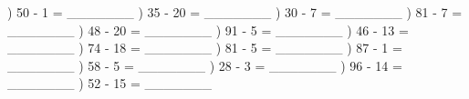 \documentclass{article}%
\begin{document}
\newline%
) 50 {-} 1 = \_\_\_\_\_\_\_%
\newline%
\newline%
) 35 {-} 20 = \_\_\_\_\_\_\_%
\newline%
\newline%
) 30 {-} 7 = \_\_\_\_\_\_\_%
\newline%
\newline%
) 81 {-} 7 = \_\_\_\_\_\_\_%
\newline%
\newline%
) 48 {-} 20 = \_\_\_\_\_\_\_%
\newline%
\newline%
) 91 {-} 5 = \_\_\_\_\_\_\_%
\newline%
\newline%
) 46 {-} 13 = \_\_\_\_\_\_\_%
\newline%
\newline%
) 74 {-} 18 = \_\_\_\_\_\_\_%
\newline%
\newline%
) 81 {-} 5 = \_\_\_\_\_\_\_%
\newline%
\newline%
) 87 {-} 1 = \_\_\_\_\_\_\_%
\newline%
\newline%
) 58 {-} 5 = \_\_\_\_\_\_\_%
\newline%
\newline%
) 28 {-} 3 = \_\_\_\_\_\_\_%
\newline%
\newline%
) 96 {-} 14 = \_\_\_\_\_\_\_%
\newline%
\newline%
) 52 {-} 15 = \_\_\_\_\_\_\_%
\newline%
\newline%
\newline%
\end{document}

